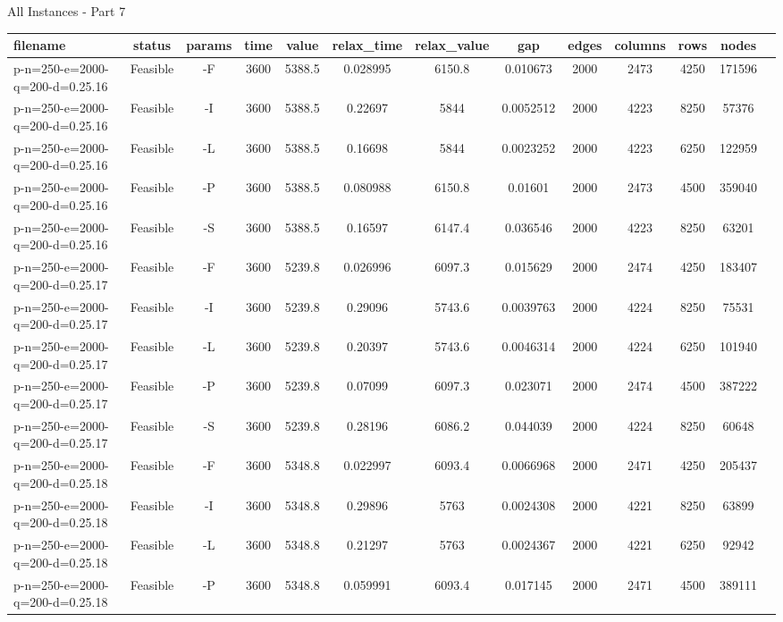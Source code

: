 \documentclass[landscape, a4paper]{article}
\begin{document}
\begin{center}
All Instances - Part 7

\begin{tabular}{lcccccccccccc}
filename & status & params & time & value & relax\_time & relax\_value & gap & edges & columns & rows & nodes & \\
\hline
p-n=250-e=2000-q=200-d=0.25.16 & Feasible & -F & 3600 & 5388.5 & 0.028995 & 6150.8 & 0.010673 & 2000 & 2473 & 4250 & 171596 & \\
p-n=250-e=2000-q=200-d=0.25.16 & Feasible & -I & 3600 & 5388.5 & 0.22697 & 5844 & 0.0052512 & 2000 & 4223 & 8250 & 57376 & \\
p-n=250-e=2000-q=200-d=0.25.16 & Feasible & -L & 3600 & 5388.5 & 0.16698 & 5844 & 0.0023252 & 2000 & 4223 & 6250 & 122959 & \\
p-n=250-e=2000-q=200-d=0.25.16 & Feasible & -P & 3600 & 5388.5 & 0.080988 & 6150.8 & 0.01601 & 2000 & 2473 & 4500 & 359040 & \\
p-n=250-e=2000-q=200-d=0.25.16 & Feasible & -S & 3600 & 5388.5 & 0.16597 & 6147.4 & 0.036546 & 2000 & 4223 & 8250 & 63201 & \\
p-n=250-e=2000-q=200-d=0.25.17 & Feasible & -F & 3600 & 5239.8 & 0.026996 & 6097.3 & 0.015629 & 2000 & 2474 & 4250 & 183407 & \\
p-n=250-e=2000-q=200-d=0.25.17 & Feasible & -I & 3600 & 5239.8 & 0.29096 & 5743.6 & 0.0039763 & 2000 & 4224 & 8250 & 75531 & \\
p-n=250-e=2000-q=200-d=0.25.17 & Feasible & -L & 3600 & 5239.8 & 0.20397 & 5743.6 & 0.0046314 & 2000 & 4224 & 6250 & 101940 & \\
p-n=250-e=2000-q=200-d=0.25.17 & Feasible & -P & 3600 & 5239.8 & 0.07099 & 6097.3 & 0.023071 & 2000 & 2474 & 4500 & 387222 & \\
p-n=250-e=2000-q=200-d=0.25.17 & Feasible & -S & 3600 & 5239.8 & 0.28196 & 6086.2 & 0.044039 & 2000 & 4224 & 8250 & 60648 & \\
p-n=250-e=2000-q=200-d=0.25.18 & Feasible & -F & 3600 & 5348.8 & 0.022997 & 6093.4 & 0.0066968 & 2000 & 2471 & 4250 & 205437 & \\
p-n=250-e=2000-q=200-d=0.25.18 & Feasible & -I & 3600 & 5348.8 & 0.29896 & 5763 & 0.0024308 & 2000 & 4221 & 8250 & 63899 & \\
p-n=250-e=2000-q=200-d=0.25.18 & Feasible & -L & 3600 & 5348.8 & 0.21297 & 5763 & 0.0024367 & 2000 & 4221 & 6250 & 92942 & \\
p-n=250-e=2000-q=200-d=0.25.18 & Feasible & -P & 3600 & 5348.8 & 0.059991 & 6093.4 & 0.017145 & 2000 & 2471 & 4500 & 389111 & \\

\end{tabular}
\end{center}
\end{document}
